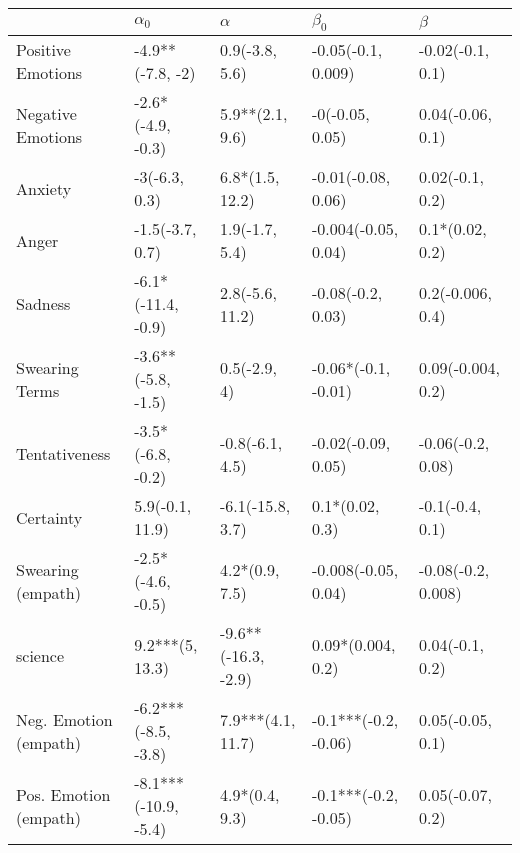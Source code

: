 \begin{tabular}{lllll}
\toprule
{} &            $\alpha_0$ &             $\alpha$ &             $\beta_0$ &             $\beta$ \\
\midrule
Positive Emotions     &      -4.9**(-7.8, -2) &       0.9(-3.8, 5.6) &    -0.05(-0.1, 0.009) &    -0.02(-0.1, 0.1) \\
Negative Emotions     &     -2.6*(-4.9, -0.3) &      5.9**(2.1, 9.6) &       -0(-0.05, 0.05) &    0.04(-0.06, 0.1) \\
Anxiety               &         -3(-6.3, 0.3) &      6.8*(1.5, 12.2) &    -0.01(-0.08, 0.06) &     0.02(-0.1, 0.2) \\
Anger                 &       -1.5(-3.7, 0.7) &       1.9(-1.7, 5.4) &   -0.004(-0.05, 0.04) &     0.1*(0.02, 0.2) \\
Sadness               &    -6.1*(-11.4, -0.9) &      2.8(-5.6, 11.2) &     -0.08(-0.2, 0.03) &    0.2(-0.006, 0.4) \\
Swearing Terms        &    -3.6**(-5.8, -1.5) &         0.5(-2.9, 4) &   -0.06*(-0.1, -0.01) &   0.09(-0.004, 0.2) \\
Tentativeness         &     -3.5*(-6.8, -0.2) &      -0.8(-6.1, 4.5) &    -0.02(-0.09, 0.05) &   -0.06(-0.2, 0.08) \\
Certainty             &       5.9(-0.1, 11.9) &     -6.1(-15.8, 3.7) &       0.1*(0.02, 0.3) &     -0.1(-0.4, 0.1) \\
Swearing (empath)     &     -2.5*(-4.6, -0.5) &       4.2*(0.9, 7.5) &   -0.008(-0.05, 0.04) &  -0.08(-0.2, 0.008) \\
science               &       9.2***(5, 13.3) &  -9.6**(-16.3, -2.9) &     0.09*(0.004, 0.2) &     0.04(-0.1, 0.2) \\
Neg. Emotion (empath) &   -6.2***(-8.5, -3.8) &    7.9***(4.1, 11.7) &  -0.1***(-0.2, -0.06) &    0.05(-0.05, 0.1) \\
Pos. Emotion (empath) &  -8.1***(-10.9, -5.4) &       4.9*(0.4, 9.3) &  -0.1***(-0.2, -0.05) &    0.05(-0.07, 0.2) \\
\bottomrule
\end{tabular}
